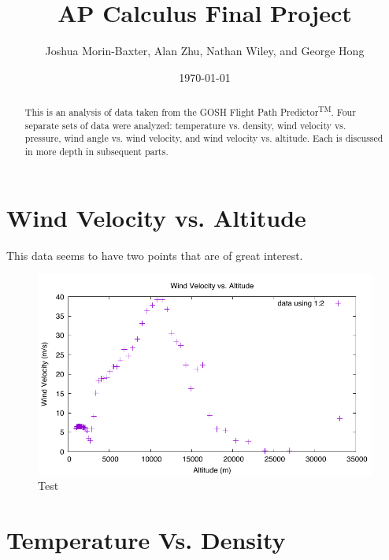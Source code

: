 \documentclass{journal}
\begin{document}
\title{AP Calculus Final Project}
\author{Joshua Morin-Baxter, Alan Zhu, Nathan Wiley, and George Hong}
\date{\today}

\maketitle

\begin{abstract}
This is an analysis of data taken from the GOSH Flight Path Predictor\textsuperscript{TM}.
Four separate sets of data were analyzed:
temperature vs. density, wind velocity vs. pressure, wind angle vs. wind velocity, and wind velocity vs. altitude.
Each is discussed in more depth in subsequent parts.
\end{abstract}

\part{Wind Velocity vs. Altitude}
This data seems to have two points that are of great interest.
\begin{figure}[h]
\centering
\includegraphics{josh-images/figure1.pdf}
\caption{Test}

\end{figure}


\part{Temperature Vs. Density}
\end{document}
